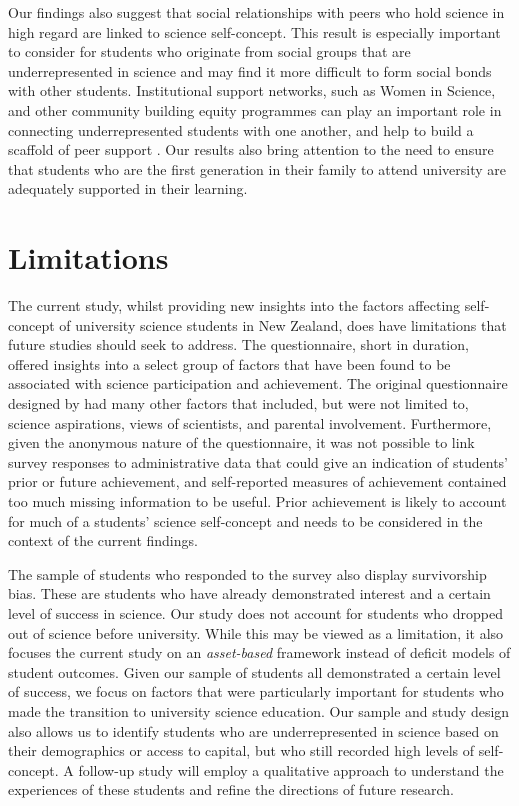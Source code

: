 Our findings also suggest that social relationships with peers who hold science in high regard are linked to science self-concept. This result is especially important to consider for students who originate from social groups that are underrepresented in science and may find it more difficult to form social bonds with other students. Institutional support networks, such as Women in Science, and other community building equity programmes can play an important role in connecting underrepresented students with one another, and help to build a scaffold of peer support \citep{ong2018counterspaces}. Our results also bring attention to the need to ensure that students who are the first generation in their family to attend university are adequately supported in their learning.  

\section{Limitations}
The current study, whilst providing new insights into the factors affecting self-concept of university science students in New Zealand, does have limitations that future studies should seek to address. The questionnaire, short in duration, offered insights into a select group of factors that have been found to be associated with science participation and achievement. The original questionnaire designed by \cite{dewitt2011high} had many other factors that included, but were not limited to, science aspirations, views of scientists, and parental involvement. Furthermore, given the anonymous nature of the questionnaire, it was not possible to link survey responses to administrative data that could give an indication of students' prior or future achievement, and self-reported measures of achievement contained too much missing information to be useful. Prior achievement is likely to account for much of a students' science self-concept and needs to be considered in the context of the current findings.

The sample of students who responded to the survey also display survivorship bias. These are students who have already demonstrated interest and a certain level of success in science. Our study does not account for students who dropped out of science before university. While this may be viewed as a limitation, it also focuses the current study on an \textit{asset-based} framework instead of deficit models of student outcomes. Given our sample of students all demonstrated a certain level of success, we focus on factors that were particularly important for students who made the transition to university science education. Our sample and study design also allows us to identify students who are underrepresented in science based on their demographics or access to capital, but who still recorded high levels of self-concept. A follow-up study will employ a qualitative approach to understand the experiences of these students and refine the directions of future research.


